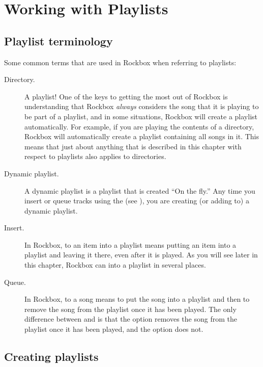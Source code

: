 \section{\label{ref:working_with_playlists}Working with Playlists}
\subsection{Playlist terminology}
Some common terms that are used in Rockbox when referring to
playlists:

\begin{description}
\item[Directory.] A playlist! One of the keys to getting the most out of
  Rockbox is understanding that Rockbox \emph{always} considers the song that
  it is playing to be part of a playlist, and in some situations, Rockbox will
  create a playlist automatically. For example, if you are playing the
  contents of a directory, Rockbox will automatically create a playlist
  containing all songs in it. This means that just about anything
  that is described in this chapter with respect to playlists also applies to
  directories.

\item[Dynamic playlist.]  A dynamic playlist is a playlist that is created
  ``On the fly.'' Any time you insert or queue tracks using the
   (see ), you are
  creating (or adding to) a dynamic playlist.

\item[Insert.] In Rockbox, to  an item into a playlist means
  putting an item into a playlist and leaving it there, even after it is
  played. As you will see later in this chapter, Rockbox can 
  into a playlist in several places.

\item[Queue.] In Rockbox, to  a song means to put the song
  into a playlist and then to remove the song from the playlist once it has
  been played. The only difference between  and
   is that the  option removes the song from the
  playlist once it has been played, and the  option does not.
\end{description}

\subsection{Creating playlists}

